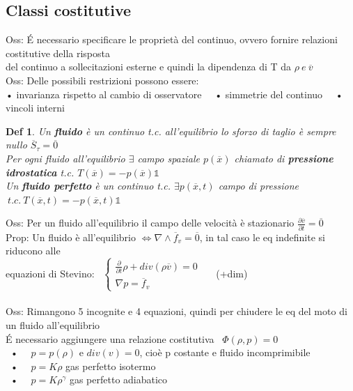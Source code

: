 \documentclass{article}
\theoremstyle{unnumbered}
\newtheorem* {theoremT}{Def}
\theoremstyle{unnumbered1}
\newenvironment{defi}{\begin{gBox}\begin{theoremT}}{\end{theoremT}\end{gBox}}
\begin{document}
\subsection{Classi costitutive}
%
Oss: É necessario specificare le proprietà del continuo, ovvero fornire relazioni costitutive della risposta\\
\phantom{Oss: }del continuo a sollecitazioni esterne e quindi la dipendenza di T da $\rho \ e \ \overline{v}$\\
Oss: Delle possibili restrizioni possono essere:\\ 
\phantom{Oss: }• invarianza rispetto al cambio di osservatore \ \ • simmetrie del continuo \ \ • vincoli interni
%
\begin{defi}
Un \textbf{fluido} è un continuo t.c. all'equilibrio lo sforzo di taglio è sempre nullo $\overline{S}_{\tau}=\overline{0}$\\
Per ogni fluido all'equilibrio $\exists$ campo spaziale $p(\overline{x})$ chiamato di \textbf{pressione idrostatica} t.c. $T(\overline{x})=-p(\overline{x})\mathds{1}$\\
%
Un \textbf{fluido perfetto} è un continuo t.c. $\exists p(\overline{x},t) $ campo di pressione $ \ t.c. \ T(\overline{x},t)=-p(\overline{x},t)\mathds{1}$
\end{defi}
%
Oss: Per un fluido all'equilibrio il campo delle velocità è stazionario $\frac{\partial \overline{v}}{\partial t}=\overline{0}$\\
%
%
%
Prop: Un fluido è all'equilibrio $\Longleftrightarrow\nabla \wedge \overline{f}_v=\overline{0}$, in tal caso le eq indefinite si riducono alle\\ \phantom{Prop: }equazioni di Stevino: \ 
$\begin{cases} \frac{\partial}{\partial t}\rho+div(\rho\overline{v})=0 \\ \nabla p=\overline{f}_v \end{cases}$\ \ \ (+dim)\\ \\
%
%
%
Oss: Rimangono 5 incognite e 4 equazioni, quindi per chiudere le eq del moto di un fluido all'equilibrio\\
\phantom{Oss: }É necessario aggiungere una relazione costitutiva \ $\Phi(\rho,p)=0$\\
\ • \ \ $p=p(\rho) \text{ e } div(v)=0$, cioè p costante e fluido incomprimibile\\
\ • \ \ $p=K\rho$ gas perfetto isotermo\\
\ • \ \ $p=K\rho^{\gamma}$ gas perfetto adiabatico\\ \\
\end{document}
